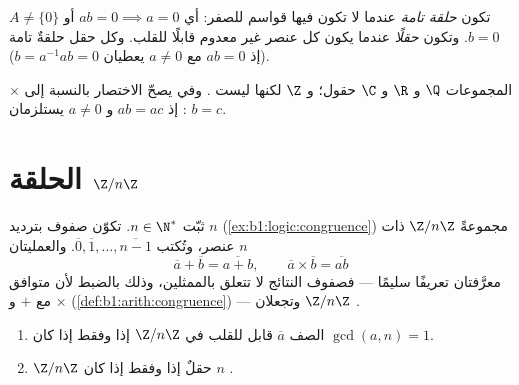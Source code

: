\begin{definition}\label{def:b1:structures:field}
  $A \neq \{0\}$ تكون \emph{حلقة
تامة} عندما لا تكون فيها قواسم للصفر: أي $ab = 0
\implies a = 0$ أو $b = 0$. وتكون \emph{حقلًا} عندما يكون
كل عنصر غير معدوم قابلًا للقلب. وكل حقل حلقةٌ تامة (إذ $ab = 0$ مع $a \neq 0$ يعطيان $b = a^{-1}ab = 0$).
\end{definition}

\begin{example}
المجموعات $\Q$ و $\R$ و $\C$ حقول؛ و $\Z$  لكنها ليست
. وفي  يصحّ الاختصار بالنسبة إلى $\times$: إذ $ab =
ac$ و $a \neq 0$ يستلزمان $b = c$.
\end{example}

\section{الحلقة $\Z/n\Z$}

\begin{definition}\label{def:b1:structures:zn}
ثبّت $n \in \N^*$. تكوّن صفوف  بترديد $n$
(\cref{ex:b1:logic:congruence}) مجموعةً
$\Z/n\Z$ ذات $n$ عنصر، وتُكتب $\overline 0,
\overline 1, \dots, \overline{n-1}$. والعمليتان
\[
\overline a + \overline b = \overline{a + b},
\qquad
\overline a \times \overline b = \overline{ab}
\]
معرَّفتان تعريفًا سليمًا --- فصفوف النتائج لا تتعلق
بالممثلين، وذلك بالضبط لأن  متوافق مع $+$
و $\times$ (\cref{def:b1:arith:congruence}) --- وتجعلان $\Z/n\Z$ 
.
\end{definition}

\begin{theorem}\label{thm:b1:structures:zp}
\begin{enumerate}
  \item الصف $\overline a$ قابل للقلب في $\Z/n\Z$ إذا وفقط إذا كان
        $\gcd(a, n) = 1$.
  \item {} $\Z/n\Z$ حقلٌ إذا وفقط إذا كان $n$ .
\end{enumerate}
\end{theorem}

